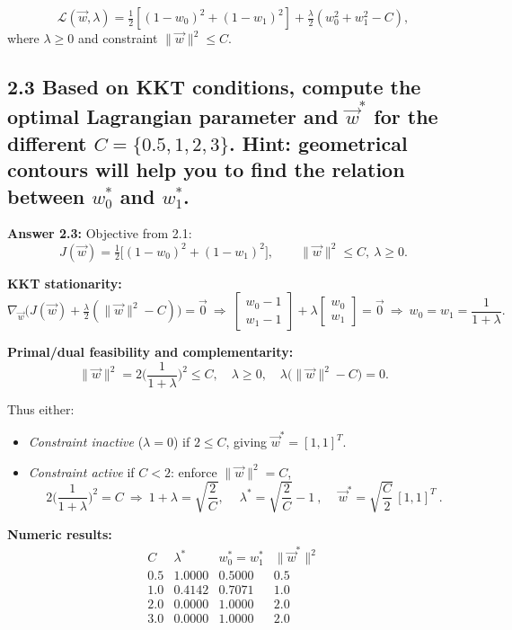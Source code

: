 \documentclass[12pt]{article}
\begin{document}
\[
\mathcal L(\vec w,\lambda)=
\tfrac12[(1-w_0)^2+(1-w_1)^2]+\tfrac{\lambda}{2}(w_0^2+w_1^2-C),
\]
where $\lambda\ge0$ and constraint $\|\vec w\|^2\le C$.

\subsection*{2.3
Based on KKT conditions, compute the optimal Lagrangian parameter and $\vec{w}^*$ for the different $C = \{0.5, 1, 2, 3\}$. Hint: geometrical contours will help you to find the relation between $w_0^*$ and $w_1^*$.}
\textbf{Answer 2.3:}  
Objective from 2.1:
\[
J(\vec w)=\tfrac12\big[(1-w_0)^2+(1-w_1)^2\big],
\qquad \|\vec w\|^2\le C,\ \lambda\ge 0.
\]

\textbf{KKT stationarity:}
\[
\nabla_{\vec w}\Big(J(\vec w)+\tfrac{\lambda}{2}(\| \vec w\|^2-C)\Big)=\vec 0
\ \Longrightarrow\ 
\begin{bmatrix}w_0-1\\ w_1-1\end{bmatrix}+\lambda\begin{bmatrix}w_0\\ w_1\end{bmatrix}=\vec 0
\ \Rightarrow\ 
w_0=w_1=\frac{1}{1+\lambda}.
\]

\textbf{Primal/dual feasibility and complementarity:}
\[
\|\vec w\|^2=2\Big(\frac{1}{1+\lambda}\Big)^2\le C, \quad \lambda\ge 0,\quad 
\lambda\big(\|\vec w\|^2-C\big)=0.
\]

Thus either:
\begin{itemize}
\item \emph{Constraint inactive} ($\lambda=0$) if $2\le C$, giving $\vec w^*=[1,1]^T$.
\item \emph{Constraint active} if $C<2$: enforce $\|\vec w\|^2=C$,
\[
2\Big(\frac{1}{1+\lambda}\Big)^2=C
\ \Longrightarrow\ 
1+\lambda=\sqrt{\frac{2}{C}},\quad 
\boxed{\ \lambda^*=\sqrt{\frac{2}{C}}-1\ },\quad
\boxed{\ \vec w^*=\sqrt{\frac{C}{2}}\,[1,1]^T\ }.
\]
\end{itemize}

\medskip
\textbf{Numeric results:}
\[
\begin{array}{c|c|c|c}
C & \lambda^* & w_0^*=w_1^* & \|\vec w^*\|^2 \\ \hline
0.5 & 1.0000 & 0.5000 & 0.5 \\
1.0 & 0.4142 & 0.7071 & 1.0 \\
2.0 & 0.0000 & 1.0000 & 2.0 \\
3.0 & 0.0000 & 1.0000 & 2.0
\end{array}
\]
\end{document}
